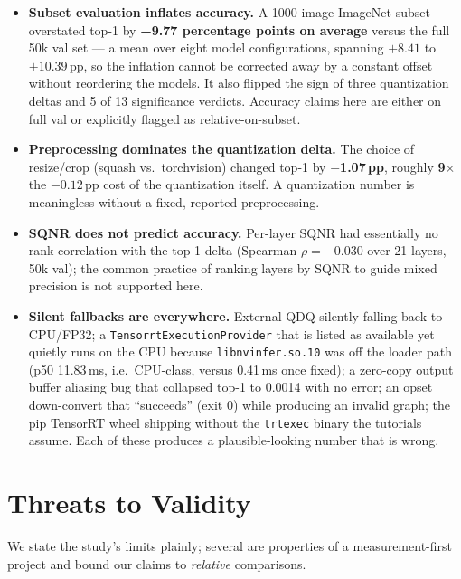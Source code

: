 \documentclass[11pt]{article}
\begin{document}
\begin{itemize}
\item \textbf{Subset evaluation inflates accuracy.} A 1000-image ImageNet subset overstated top-1 by \textbf{+9.77 percentage points on average} versus the full 50k val set --- a mean over eight model configurations, spanning $+8.41$ to $+10.39$\,pp, so the inflation cannot be corrected away by a constant offset without reordering the models. It also flipped the sign of three quantization deltas and 5 of 13 significance verdicts. Accuracy claims here are either on full val or explicitly flagged as relative-on-subset.
\item \textbf{Preprocessing dominates the quantization delta.} The choice of resize/crop (squash vs.\ torchvision) changed top-1 by \textbf{$-$1.07\,pp}, roughly \textbf{9$\times$} the $-0.12$\,pp cost of the quantization itself. A quantization number is meaningless without a fixed, reported preprocessing.
\item \textbf{SQNR does not predict accuracy.} Per-layer SQNR had essentially no rank correlation with the top-1 delta (Spearman $\rho = -0.030$ over 21 layers, 50k val); the common practice of ranking layers by SQNR to guide mixed precision is not supported here.
\item \textbf{Silent fallbacks are everywhere.} External QDQ silently falling back to CPU/FP32; a \texttt{TensorrtExecutionProvider} that is listed as available yet quietly runs on the CPU because \texttt{libnvinfer.so.10} was off the loader path (p50 11.83\,ms, i.e.\ CPU-class, versus 0.41\,ms once fixed); a zero-copy output buffer aliasing bug that collapsed top-1 to 0.0014 with no error; an opset down-convert that ``succeeds'' (exit 0) while producing an invalid graph; the pip TensorRT wheel shipping without the \texttt{trtexec} binary the tutorials assume. Each of these produces a plausible-looking number that is wrong.
\end{itemize}

\section{Threats to Validity}

We state the study's limits plainly; several are properties of a measurement-first project and bound our claims to \emph{relative} comparisons.
\end{document}
